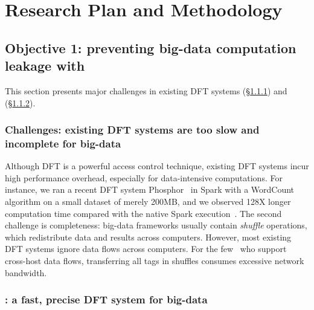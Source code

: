 \vspace{-.15in}\section{Research Plan and Methodology}
\label{sec:plan}

% 

\vspace{-.15in}\subsection{Objective 1: 
preventing big-data computation leakage with \kakute}\label{sec:obj1}
\vspace{-.075in}
This section presents major challenges in existing DFT systems 
(\S\ref{sec:obj1-problem}) and \kakute (\S\ref{sec:kakute}).

\vspace{-.15in}
\subsubsection{Challenges: existing DFT systems are too slow and incomplete for 
big-data} 
\label{sec:obj1-problem}\vspace{-.075in}

Although DFT is a powerful access control technique, existing DFT systems incur 
high performance overhead, especially for data-intensive computations. For 
instance, we ran a recent DFT system Phosphor~\cite{oo14:phosphor} in Spark 
with a WordCount algorithm on a small dataset of merely 200MB, and we observed 
128X longer computation time compared with the native Spark 
execution~\cite{kakute:acsac17}. The second challenge is completeness: 
big-data frameworks usually contain \emph{shuffle} operations, which 
redistribute data and results across computers. However, most existing DFT 
systems ignore data flows across computers. For the 
few~\cite{cloudfence:raid13} who support cross-host data flows, transferring 
all tags in shuffles consumes excessive network bandwidth.

\vspace{-.15in}\subsubsection{\kakute: a fast, precise DFT system for big-data} 
\label{sec:kakute}\vspace{-.075in}

